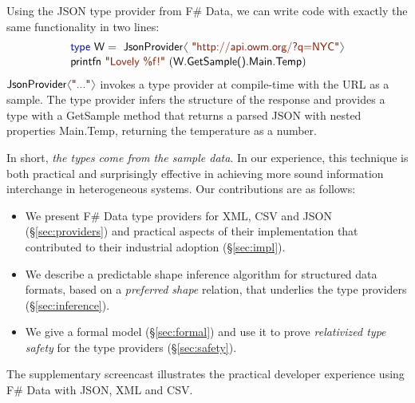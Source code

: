 \documentclass[10pt,preprint,blind,clearpagebib]{sigplanconf}
\newcommand{\langl}{\begin{picture}(4.5,7)
\put(1.1,2.5){\rotatebox{60}{\line(1,0){5.5}}}
\put(1.1,2.5){\rotatebox{300}{\line(1,0){5.5}}}
\end{picture}}
\newcommand{\rangl}{\begin{picture}(4.5,7)
\put(.9,2.5){\rotatebox{120}{\line(1,0){5.5}}}
\put(.9,2.5){\rotatebox{240}{\line(1,0){5.5}}}
\end{picture}}
\newcommand{\kvd}[1]{\textnormal{\textcolor{kvdclr}{\sffamily #1}}}
\newcommand{\str}[1]{\textnormal{\textcolor{strclr}{\sffamily "#1"}}}
\newcommand{\ident}[1]{\textnormal{\sffamily #1}}
\begin{document}
Using the JSON type provider from F\# Data, we can write code with exactly the 
same functionality in two lines:
%
\vspace{-0.1em}
\begin{equation*}
\begin{array}{l}
 \kvd{type}~\ident{W} = \ident{JsonProvider}\langl\str{http://api.owm.org/?q=NYC}\rangl \\[0.1em]
 \ident{printfn}~\str{Lovely \%f!}~(\ident{W.GetSample().Main.Temp})
\end{array}
\end{equation*}
%
$\ident{JsonProvider}\langl\str{...}\rangl$ invokes a type provider \cite{fsharp-typeprov} at 
compile-time with the URL as a sample. The type provider infers the structure of the response
and provides a type with a \ident{GetSample} method that returns a parsed JSON with nested
properties \ident{Main.Temp}, returning the temperature as a number.

In short, \emph{the types come from the sample data}. In our experience, this technique is 
both practical and surprisingly effective in achieving more sound information interchange 
in heterogeneous systems. Our contributions are as follows:

\begin{itemize}
\item We present F\# Data type providers for XML, CSV and JSON (\S\ref{sec:providers}) 
  and practical aspects of their implementation that contributed to their industrial 
  adoption (\S\ref{sec:impl}). 

\item We describe a predictable shape inference algorithm for structured data formats, 
  based on a \emph{preferred shape} relation, that underlies the type providers 
  (\S\ref{sec:inference}).

\item We give a formal model (\S\ref{sec:formal}) and use it to prove
  \emph{relativized type safety} for the type providers (\S\ref{sec:safety}).
\end{itemize}

\vspace{-0.1em}
\noindent
The supplementary screencast illustrates the practical developer experience using 
  F\# Data with JSON, XML and CSV.


%
%
\end{document}

